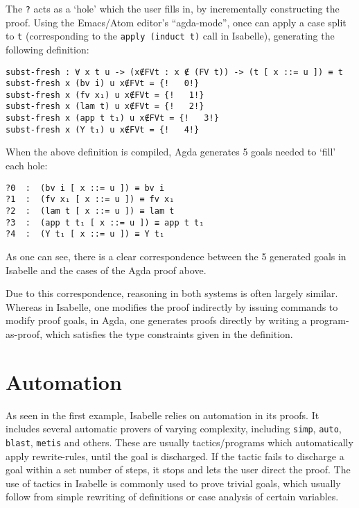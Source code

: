 \documentclass[a4paper, 12pt, twoside]{style/ociamthesis}
\theoremstyle{plain}
\theoremstyle{definition}
\theoremstyle{remark}
\begin{document}
The \texttt{?} acts as a `hole' which the user fills in, by
incrementally constructing the proof. Using the Emacs/Atom editor's
``agda-mode'', once can apply a case split to \texttt{t} (corresponding
to the \texttt{apply (induct t)} call in Isabelle), generating the
following definition:

\begin{verbatim}
subst-fresh : ∀ x t u -> (x∉FVt : x ∉ (FV t)) -> (t [ x ::= u ]) ≡ t
subst-fresh x (bv i) u x∉FVt = {!   0!}
subst-fresh x (fv x₁) u x∉FVt = {!   1!}
subst-fresh x (lam t) u x∉FVt = {!   2!}
subst-fresh x (app t t₁) u x∉FVt = {!   3!}
subst-fresh x (Y t₁) u x∉FVt = {!   4!}
\end{verbatim}

When the above definition is compiled, Agda generates 5 goals needed to
`fill' each hole:

\begin{verbatim}
?0  :  (bv i [ x ::= u ]) ≡ bv i
?1  :  (fv x₁ [ x ::= u ]) ≡ fv x₁
?2  :  (lam t [ x ::= u ]) ≡ lam t
?3  :  (app t t₁ [ x ::= u ]) ≡ app t t₁
?4  :  (Y t₁ [ x ::= u ]) ≡ Y t₁
\end{verbatim}

As one can see, there is a clear correspondence between the 5 generated
goals in Isabelle and the cases of the Agda proof above.

Due to this correspondence, reasoning in both systems is often largely
similar. Whereas in Isabelle, one modifies the proof indirectly by
issuing commands to modify proof goals, in Agda, one generates proofs
directly by writing a program-as-proof, which satisfies the type
constraints given in the definition.

\section{Automation}\label{automation}

As seen in the first example, Isabelle relies on automation in its
proofs. It includes several automatic provers of varying complexity,
including \texttt{simp}, \texttt{auto}, \texttt{blast}, \texttt{metis}
and others. These are usually tactics/programs which automatically apply
rewrite-rules, until the goal is discharged. If the tactic fails to
discharge a goal within a set number of steps, it stops and lets the
user direct the proof. The use of tactics in Isabelle is commonly used
to prove trivial goals, which usually follow from simple rewriting of
definitions or case analysis of certain variables.\\
\(\ \)
\end{document}
